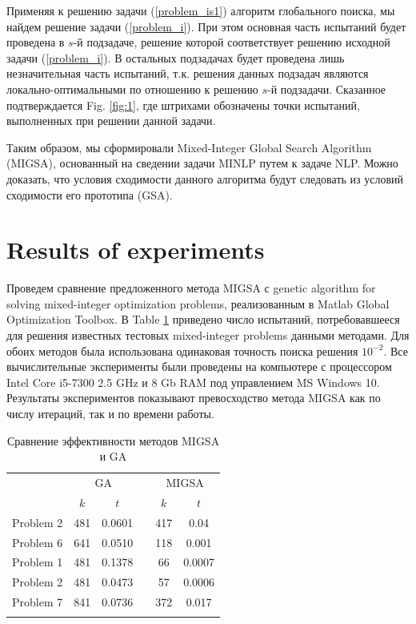 \documentclass{llncs}
\begin{document}
Применяя к решению задачи (\ref{problem_is1}) алгоритм глобального поиска, мы найдем решение задачи (\ref{problem_i}). При этом основная часть испытаний будет проведена в $s$-й подзадаче, решение которой соответствует решению исходной задачи (\ref{problem_i}). В остальных подзадачах будет проведена лишь незначительная часть испытаний, т.к. решения данных подзадач являются локально-оптимальными по отношению к решению $s$-й подзадачи. Сказанное подтверждается Fig. \ref{fig:1}, где штрихами обозначены точки испытаний, выполненных при решении данной задачи.

Таким образом, мы сформировали Mixed-Integer Global Search Algorithm (MIGSA), основанный на сведении задачи MINLP путем к задаче NLP. Можно доказать, что условия сходимости данного алгоритма будут следовать из условий сходимости его прототипа (GSA).

\section{Results of experiments}

\Russian
Проведем сравнение предложенного метода MIGSA с genetic algorithm for solving mixed-integer optimization problems, реализованным в Matlab Global Optimization Toolbox. В Table \ref{tab:1} приведено число испытаний, потребовавшееся для решения известных тестовых mixed-integer problems данными методами. Для обоих методов была использована одинаковая точность поиска решения $10^{-2}$. Все вычислительные эксперименты были проведены на компьютере с процессором Intel Core i5-7300 2.5 GHz и 8 Gb RAM под управлением MS Windows 10. Результаты экспериментов показывают превосходство метода MIGSA как по числу итераций, так и по времени работы.

\begin{table}
	\caption{Сравнение эффективности методов MIGSA и GA}
	\label{tab:1}
	\center
	\begin{tabular}{cccccc}
		\hline\noalign{\smallskip}
	\multirow{2}{*}{Test problem}	 & \multicolumn{2}{c}{ GA } & & \multicolumn{2}{c}{MIGSA} \\
		\noalign{\smallskip} \cline{2-3} \cline{5-6} \noalign{\smallskip}
		 & $k$ & $t$ & & $k$ & $t$  \\
		\noalign{\smallskip} \hline \noalign{\smallskip}
		 Problem 2 \cite{Floudas}&	481 &	0.0601 & &	417 &	0.04 \\
		 Problem 6 \cite{Floudas}&	641 &	0.0510 & &	118 &	0.001 \\
		 Problem 1 \cite{Deep}   &	481 &	0.1378 & &	66 &	0.0007 \\
		 Problem 2 \cite{Deep}   &	481 &	0.0473 & &	57 &	0.0006 \\
		 Problem 7 \cite{Deep}   &	841 &	0.0736 & & 372	 &	0.017 \\
		\noalign{\smallskip}\hline
	\end{tabular}
\end{table}
\end{document}
